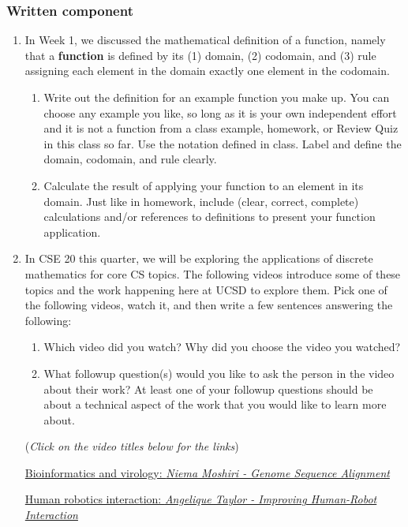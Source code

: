 \documentclass[12pt, oneside]{article}
\begin{document}
\subsubsection*{Written component}
\begin{enumerate}
\item 

In Week 1, we discussed the mathematical definition of a function, namely
that a {\bf function} is defined by its (1) domain, (2) codomain, and (3) rule assigning each 
element in the domain exactly one element in the codomain.

\begin{enumerate}
    \item Write out the definition for an example function you make up.
    You can choose any example you like, so long as it is your own independent 
    effort and it is not a function from a class example, homework, or Review Quiz in this class so far.
    Use the notation defined in class. Label and define the domain, codomain, and rule clearly.
    \item Calculate the result of applying your function to an element in its domain.
    Just like in homework, include (clear, correct, complete) calculations and/or references to definitions
    to present your function application.
\end{enumerate}

\item In CSE 20 this quarter, we will be exploring the applications of discrete mathematics for core CS topics. 
The following videos introduce some of these topics and the 
work happening here at UCSD to explore them. Pick one of the following videos, watch it, and 
then write a few sentences answering the following:
\begin{enumerate}
\item Which video did you watch? Why did you choose the video you watched?
\item What followup question(s) would you like to ask the person in the video about their work?
At least one of your followup questions should be about a technical aspect of the work that you
would like to learn more about.
\end{enumerate}

({\it Click on the video titles below for the links})

\href{https://www.youtube.com/watch?v=PrAoks7OhE8}{Bioinformatics and virology: 
{\it Niema Moshiri - Genome Sequence Alignment}}

\href{https://www.uctv.tv/computer-science/search-details.aspx?showID=33425}{Human robotics interaction: 
{\it Angelique Taylor - Improving Human-Robot Interaction}}


\end{enumerate}
\end{document}
